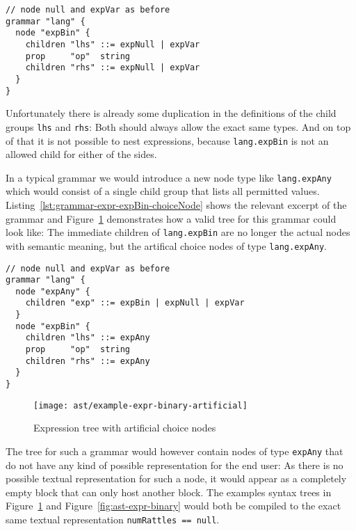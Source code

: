 \documentclass[sigconf,natbib=false]{acmart}
\newcommand\astScale{0.7}
\begin{document}
\begin{lstlisting}[caption={Grammar for expression \texttt{expBin}}, label=lst:grammar-expr-expBin-verbose]
// node null and expVar as before
grammar "lang" {
  node "expBin" {
    children "lhs" ::= expNull | expVar
    prop     "op"  string
    children "rhs" ::= expNull | expVar
  }
}
\end{lstlisting}

Unfortunately there is already some duplication in the definitions of the child groups \texttt{lhs} and \texttt{rhs}: Both should always allow the exact same types. And on top of that it is not possible to nest expressions, because \texttt{lang.expBin} is not an allowed child for either of the sides.

In a typical grammar we would introduce a new node type like \texttt{lang.expAny} which would consist of a single child group that lists all permitted values. Listing~\ref{lst:grammar-expr-expBin-choiceNode} shows the relevant excerpt of the grammar and Figure~\ref{fig:ast-choice-node} demonstrates how a valid tree for this grammar could look like: The immediate children of \texttt{lang.expBin} are no longer the actual nodes with semantic meaning, but the artifical choice nodes of type \texttt{lang.expAny}.


\begin{lstlisting}[caption={Grammar for expression \texttt{expBin} with choice node}, label=lst:grammar-expr-expBin-choiceNode]
// node null and expVar as before
grammar "lang" {
  node "expAny" {
    children "exp" ::= expBin | expNull | expVar
  }
  node "expBin" {
    children "lhs" ::= expAny
    prop     "op"  string
    children "rhs" ::= expAny
  }
}
\end{lstlisting}

\begin{figure}
  \texttt{[image: ast/example-expr-binary-artificial]}
  \caption{Expression tree with artificial choice nodes}
  \label{fig:ast-choice-node}
\end{figure}

The tree for such a grammar would however contain nodes of type \texttt{expAny} that do not have any kind of possible representation for the end user: As there is no possible textual representation for such a node, it would appear as a completely empty block that can only host another block. The examples syntax trees in Figure~\ref{fig:ast-choice-node} and Figure~\ref{fig:ast-expr-binary} would both be compiled to the exact same textual representation \texttt{numRattles == null}.
\end{document}
